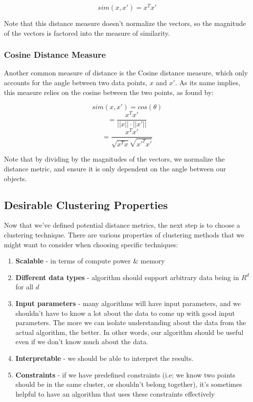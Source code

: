 \documentclass{article}
\begin{document}
\begin{equation}
	sim(x, x') = x^T x'
\end{equation}

Note that this distance measure doesn't normalize the vectors, so the magnitude of the vectors is factored into the measure of similarity.

\subsubsection{Cosine Distance Measure}

Another common measure of distance is the Cosine distance measure, which only accounts for the angle between two data points, $x$ and $x'$. As its name implies, this measure relies on the cosine between the two points, as found by:

\begin{equation}
	sim(x, x') = cos(\theta)
\end{equation}
\begin{equation}
	= \frac{x^T x'}{||x|| \cdot ||x'||}
\end{equation}
\begin{equation}
	= \frac{x^T x'}{ \sqrt{x^T x} \sqrt{{x'}^T x'} }
\end{equation}

Note that by dividing by the magnitudes of the vectors, we normalize the distance metric, and ensure it is only dependent on the angle between our objects.

\subsection{Desirable Clustering Properties}

Now that we've defined potential distance metrics, the next step is to choose a clustering technique. There are various properties of clustering methods that we might want to consider when choosing specific techniques:

\begin{enumerate}
	\item \textbf{Scalable} - in terms of compute power \& memory
	\item \textbf{Different data types} - algorithm should support arbitrary data being in $R^d$ for all $d$
	\item \textbf{Input parameters} - many algorithms will have input parameters, and we shouldn't have to know a lot about the data to come up with good input parameters. The more we can isolate understanding about the data from the actual algorithm, the better. In other words, our algorithm should be useful even if we don't know much about the data.
	\item \textbf{Interpretable} - we should be able to interpret the results.
	\item \textbf{Constraints} - if we have predefined constraints (i.e: we know two points should be in the same cluster, or shouldn't belong together), it's sometimes helpful to have an algorithm that uses these constraints effectively
\end{enumerate}
\end{document}
